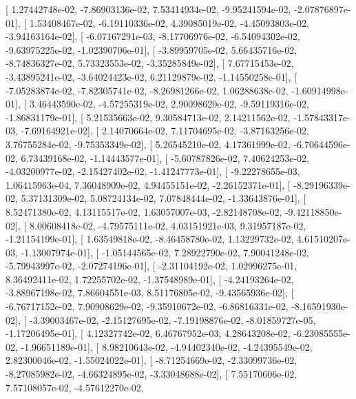 \documentclass{article}
\begin{document}
       [  1.27442748e-02,  -7.86903136e-02,   7.53414934e-02,
         -9.95241594e-02,  -2.07876897e-01],
       [  1.53408467e-02,  -6.19110336e-02,   4.39085019e-02,
         -4.45093803e-02,  -3.94163164e-02],
       [ -6.07167291e-03,  -8.17706976e-02,  -6.54094302e-02,
         -9.63975225e-02,  -1.02390706e-01],
       [ -3.89959705e-02,   5.66435716e-02,  -8.74836327e-02,
          5.73323553e-02,  -3.35285849e-02],
       [  7.67715453e-02,  -3.43895241e-02,  -3.64024423e-02,
          6.21129879e-02,  -1.14550258e-01],
       [ -7.05283874e-02,  -7.82305741e-02,  -8.26981266e-02,
          1.06288638e-02,  -1.60914998e-01],
       [  3.46443590e-02,  -4.57255319e-02,   2.90098620e-02,
         -9.59119316e-02,  -1.86831179e-01],
       [  5.21535663e-02,   9.30584713e-02,   2.14211562e-02,
         -1.57843317e-03,  -7.69164921e-02],
       [  2.14070664e-02,   7.11704695e-02,  -3.87163256e-02,
          3.76755284e-02,  -9.75353349e-02],
       [  5.26545210e-02,   4.17361999e-02,  -6.70644596e-02,
          6.73439168e-02,  -1.14443577e-01],
       [ -5.60787826e-02,   7.40624253e-02,  -4.03200977e-02,
         -2.15427402e-02,  -1.41247773e-01],
       [ -9.22278655e-03,   1.06415963e-04,   7.36048909e-02,
          4.94455151e-02,  -2.26152371e-01],
       [ -8.29196339e-02,   5.37131309e-02,   5.08724134e-02,
          7.07848444e-02,  -1.33643876e-01],
       [  8.52471380e-02,   4.13115517e-02,   1.63057007e-03,
         -2.82148708e-02,  -9.42118850e-02],
       [  8.00608418e-02,  -4.79575111e-02,   4.03151921e-03,
          9.31957187e-02,  -1.21154199e-01],
       [  1.63549818e-02,  -8.46458780e-02,   1.13229732e-02,
          4.61510207e-03,  -1.13007974e-01],
       [ -1.05144565e-02,   7.28922790e-02,   7.90041248e-02,
         -5.79943997e-02,  -2.07274196e-01],
       [ -2.31104192e-02,   1.02996275e-01,   8.36492411e-02,
          1.72255702e-02,  -1.37548989e-01],
       [ -4.24193264e-02,  -3.88967198e-02,   7.86604551e-03,
          8.51176805e-02,  -9.43565936e-02],
       [ -6.76717152e-02,   7.90908629e-02,  -9.35910672e-02,
         -6.86816331e-02,  -8.16591930e-02],
       [ -3.39003467e-02,  -2.15127695e-02,  -7.19198876e-02,
         -8.01859727e-05,  -1.17206495e-01],
       [  4.12327742e-02,   6.46767952e-03,   4.28643208e-02,
         -6.23085555e-02,  -1.96651189e-01],
       [  8.98210643e-02,  -4.94402340e-02,  -4.24395549e-02,
          2.82300046e-02,  -1.55024022e-01],
       [ -8.71254669e-02,  -2.33099736e-02,  -8.27085982e-02,
         -4.66324895e-02,  -3.33048688e-02],
       [  7.55170606e-02,   7.57108057e-02,  -4.57612270e-02,
\end{document}

